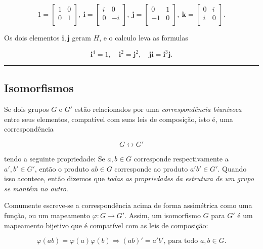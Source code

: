 \documentclass[11pt]{article}
\begin{document}
\[
1=
\begin{bmatrix}
1 & 0 \\
0 & 1 \\
\end{bmatrix},
\ \mathbf{i}=
\begin{bmatrix}
i & 0 \\
0 & -i \\
\end{bmatrix},
\ \mathbf{j}=
\begin{bmatrix}
0 & 1 \\
-1 & 0 \\
\end{bmatrix},
\ \mathbf{k}=
\begin{bmatrix}
0 & i \\
i & 0 \\
\end{bmatrix}.
\]

Os dois elementos \(\mathbf{i}, \mathbf{j}\) geram \(H\), e o calculo
leva as formulas

\[\mathbf{i}^4 = 1, \quad \mathbf{i}^2 = \mathbf{j}^2, \quad \mathbf{j}\mathbf{i} = \mathbf{i}^3\mathbf{j}.\]

\begin{center}\rule{0.5\linewidth}{0.5pt}\end{center}

\hypertarget{isomorfismos}{%
\subsection{Isomorfismos}\label{isomorfismos}}

Se dois grupos \(G\) e \(G'\) estão relacionados por uma
\emph{correspondência biunívoca} entre seus elementos, compatível com
suas leis de composição, isto é, uma correspondência

\[ 
G \longleftrightarrow G' 
\]

tendo a seguinte propriedade: Se \(a,b\in G\) corresponde
respectivamente a \(a',b' \in G'\), então o produto \(ab\in G\)
corresponde ao produto \(a'b'\in G'\). Quando isso acontece, então
dizemos que \emph{todas as propriedades da estrutura de um grupo se
mantém no outro}.

Comumente escreve-se a correspondência acima de forma assimétrica como
uma função, ou um mapeamento \(\varphi: G\longrightarrow G'\). Assim, um
isomorfismo \(G\) para \(G'\) é um mapeamento bijetivo que é compatível
com as leis de composição:

\[\varphi(ab) = \varphi(a)\varphi(b) \Rightarrow (ab)' = a'b'\text{, para todo } a,b \in G.\]
\end{document}
